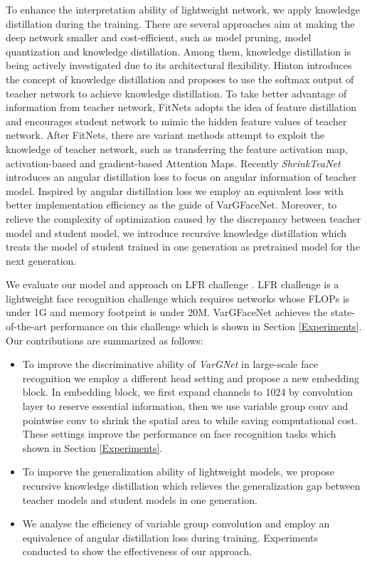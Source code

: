 \documentclass[10pt,twocolumn,letterpaper]{article}
\begin{document}
To enhance the interpretation ability of lightweight network, we apply knowledge distillation during the training. There are several approaches aim at making the deep network smaller and cost-efficient, such as model pruning, model quantization and knowledge distillation. Among them, knowledge distillation is being actively investigated due to its architectural flexibility. Hinton\cite{hinton2015distilling} introduces the concept of knowledge distillation and proposes to use the softmax output of teacher network to achieve knowledge distillation. To take better advantage of information from teacher network, FitNets\cite{romero2014fitnets} adopts the idea of feature distillation and encourages student network to mimic the hidden feature values of teacher network. After FitNets, there are variant methods attempt to exploit the knowledge of teacher network, such as transferring the feature activation map\cite{heo2018knowledge}, activation-based and gradient-based Attention Maps\cite{yim2017gift}. Recently \textit{ShrinkTeaNet} \cite{duong2019shrinkteanet} introduces an angular distillation loss to focus on angular information of teacher model.  Inspired by angular distillation loss  we employ an equivalent loss with better implementation efficiency as the guide of VarGFaceNet. Moreover, to relieve the complexity of optimization caused by the discrepancy between teacher model and student model, we introduce recursive knowledge distillation which treats the model of student trained in one generation as pretrained model for the next generation.

We evaluate our model and approach on LFR challenge \cite{LFR}. LFR challenge is a lightweight face recognition challenge which requires networks whose FLOPs is under 1G and memory footprint is under 20M. VarGFaceNet achieves the state-of-the-art performance on this challenge which is shown in Section \ref{Experiments}. Our contributions are summarized as follows:

\begin{itemize}
	\item To improve the discriminative ability of \textit{VarGNet} \cite{vargnet} in large-scale face recognition we employ a different head setting and propose a new embedding block. In embedding block, we first expand channels to 1024 by  convolution layer to reserve essential information, then we use variable group conv and pointwise conv to shrink the spatial area to  while saving computational cost. These settings improve the performance on face recognition tasks which shown in Section \ref{Experiments}.
	\item To imporve the generalization ability of lightweight models, we propose recursive knowledge distillation which relieves the generalization gap between teacher models and student models in one generation.
	\item We analyse the efficiency of variable group convolution and employ an equivalence of angular distillation loss during training. Experiments conducted to show the effectiveness of our approach.
\end{itemize}
\end{document}
